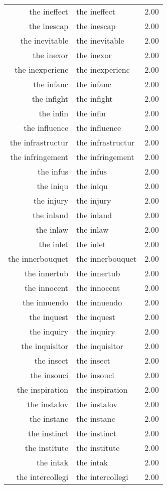 \begin{table}[ht]
\begin{tabular}{rlr}
  the ineffect & the ineffect & 2.00 \\ 
  the inescap & the inescap & 2.00 \\ 
  the inevitable & the inevitable & 2.00 \\ 
  the inexor & the inexor & 2.00 \\ 
  the inexperienc & the inexperienc & 2.00 \\ 
  the infanc & the infanc & 2.00 \\ 
  the infight & the infight & 2.00 \\ 
  the infin & the infin & 2.00 \\ 
  the influence & the influence & 2.00 \\ 
  the infrastructur & the infrastructur & 2.00 \\ 
  the infringement & the infringement & 2.00 \\ 
  the infus & the infus & 2.00 \\ 
  the iniqu & the iniqu & 2.00 \\ 
  the injury & the injury & 2.00 \\ 
  the inland & the inland & 2.00 \\ 
  the inlaw & the inlaw & 2.00 \\ 
  the inlet & the inlet & 2.00 \\ 
  the innerbouquet & the innerbouquet & 2.00 \\ 
  the innertub & the innertub & 2.00 \\ 
  the innocent & the innocent & 2.00 \\ 
  the innuendo & the innuendo & 2.00 \\ 
  the inquest & the inquest & 2.00 \\ 
  the inquiry & the inquiry & 2.00 \\ 
  the inquisitor & the inquisitor & 2.00 \\ 
  the insect & the insect & 2.00 \\ 
  the insouci & the insouci & 2.00 \\ 
  the inspiration & the inspiration & 2.00 \\ 
  the instalov & the instalov & 2.00 \\ 
  the instanc & the instanc & 2.00 \\ 
  the instinct & the instinct & 2.00 \\ 
  the institute & the institute & 2.00 \\ 
  the intak & the intak & 2.00 \\ 
  the intercollegi & the intercollegi & 2.00 \\ 

\end{tabular}
\end{table}
